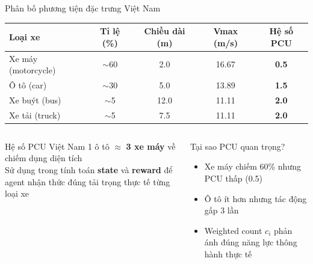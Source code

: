 \begin{frame}{Phân bố phương tiện đặc trưng Việt Nam}
  \begin{center}
  \begin{tabular}{lcccc}
    \toprule
    \textbf{Loại xe} & \textbf{Tỉ lệ (\%)} & \textbf{Chiều dài (m)} & \textbf{Vmax (m/s)} & \textbf{Hệ số PCU}\\
    \midrule
    Xe máy (motorcycle) & $\sim$60 & 2.0 & 16.67 & \textbf{0.5}\\
    Ô tô (car)          & $\sim$30 & 5.0 & 13.89 & \textbf{1.5}\\
    Xe buýt (bus)       & $\sim$5  & 12.0 & 11.11 & \textbf{2.0}\\
    Xe tải (truck)      & $\sim$5  & 7.5  & 11.11 & \textbf{2.0}\\
    \bottomrule
  \end{tabular}
  \end{center}

  \vspace{8pt}
  \begin{columns}[T]
    \begin{exampleblock}{Hệ số PCU Việt Nam}
      1 ô tô $\approx$ \textbf{3 xe máy} về chiếm dụng diện tích\\[4pt]
      Sử dụng trong tính toán \textbf{state} và \textbf{reward} để agent nhận thức đúng tải trọng thực tế từng loại xe
    \end{exampleblock}

    \begin{block}{Tại sao PCU quan trọng?}
      \begin{itemize}
        \item Xe máy chiếm 60\% nhưng PCU thấp (0.5)
        \item Ô tô ít hơn nhưng tác động gấp 3 lần
        \item Weighted count $c_i$ phản ánh đúng năng lực thông hành thực tế
      \end{itemize}
    \end{block}
  \end{columns}
\end{frame}

